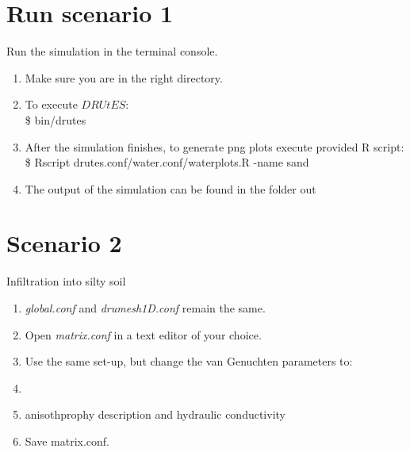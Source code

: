 \documentclass[
10pt, %
a4paper, %
oneside, %
headinclude,footinclude, %
BCOR5mm, %
]{scrartcl}
\begin{document}
\section*{Run scenario 1}
Run the simulation in the terminal console.
\begin{enumerate}
\item Make sure you are in the right directory. 
\item To execute $DRUtES$: \\
\$ bin/drutes
\item After the simulation finishes, to generate png plots execute provided R script: \\
\$ Rscript drutes.conf/water.conf/waterplots.R -name sand
\item The output of the simulation can be found in the folder out
\end{enumerate}

\section*{Scenario 2}
Infiltration into silty soil
\begin{enumerate}
\item \emph{global.conf} and \emph{drumesh1D.conf} remain the same.
\item Open \emph{matrix.conf} in a text editor of your choice. 
\item Use the same set-up, but change the van Genuchten parameters to:
\item {}
\item anisothprophy description and hydraulic conductivity\\ 
\item Save matrix.conf.
\end{enumerate}
\end{document}
